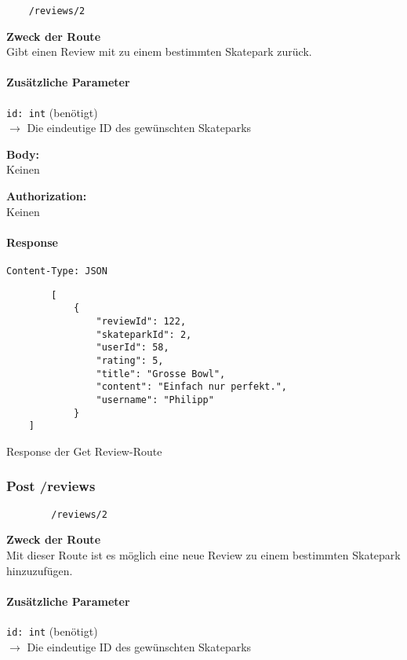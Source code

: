\begin{lstlisting}
    /reviews/2
\end{lstlisting}

\textbf{Zweck der Route} \\
Gibt einen Review mit zu einem bestimmten Skatepark zurück.



\paragraph{Zusätzliche Parameter}
\lstinline{id: int} (benötigt) \\
$\rightarrow$ Die eindeutige ID des gewünschten Skateparks


\textbf{Body:} \\
Keinen

\textbf{Authorization:} \\
Keinen

\paragraph{Response }
\begin{code}
    \lstinline{Content-Type: JSON}
    \begin{lstlisting}
        [
            {
                "reviewId": 122,
                "skateparkId": 2,
                "userId": 58,
                "rating": 5,
                "title": "Grosse Bowl",
                "content": "Einfach nur perfekt.",
                "username": "Philipp"
            }
    ]
    \end{lstlisting}
    \caption{Response der Get Review-Route}
\end{code}

\pagebreak


\subsubsection{Post /reviews}


\begin{lstlisting}
        /reviews/2
    \end{lstlisting}

\textbf{Zweck der Route} \\
Mit dieser Route ist es möglich eine neue Review zu einem bestimmten Skatepark hinzuzufügen.




\paragraph{Zusätzliche Parameter}
\lstinline{id: int} (benötigt) \\
$\rightarrow$ Die eindeutige ID des gewünschten Skateparks


